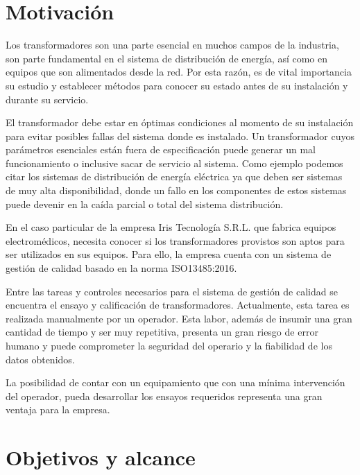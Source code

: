 
\section{Motivación}
Los transformadores son una parte esencial en muchos campos de la industria, son parte fundamental en el sistema de distribución de energía, así como en equipos que son alimentados desde la red. Por esta razón, es de vital importancia su estudio y establecer métodos para conocer su estado antes de su instalación y durante su servicio.

El transformador debe estar en óptimas condiciones al momento de su instalación para evitar posibles fallas del sistema donde es instalado. Un transformador cuyos parámetros esenciales están fuera de especificación puede generar un mal funcionamiento o inclusive sacar de servicio al sistema. Como ejemplo podemos citar los sistemas de distribución de energía eléctrica ya que deben ser sistemas de muy alta disponibilidad, donde un fallo en los componentes de estos sistemas puede devenir en la caída parcial o total del sistema distribución.

En el caso particular de la empresa Iris Tecnología S.R.L. que fabrica equipos electromédicos, necesita conocer si los transformadores provistos son aptos para ser utilizados en sus equipos. Para ello, la empresa cuenta con un sistema de gestión de calidad basado en la norma ISO13485:2016.

Entre las tareas y controles necesarios para el sistema de gestión de calidad se encuentra el ensayo y calificación de transformadores. Actualmente, esta tarea es realizada manualmente por un operador. Esta labor, además de insumir una gran cantidad de tiempo y ser muy repetitiva, presenta un gran riesgo de error humano y puede comprometer la seguridad del operario y la fiabilidad de los datos obtenidos.

La posibilidad de contar con un equipamiento que con una mínima intervención del operador, pueda desarrollar los ensayos requeridos representa una gran ventaja para la empresa.


\section{Objetivos y alcance}

